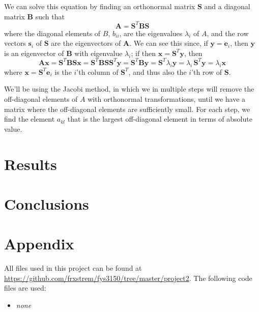 \documentclass[11pt,a4paper]{article}
\newcommand\V[1]{\mathbf{#1}}                  %
\begin{document}
We can solve this equation by finding an orthonormal matrix $\V{S}$ and a diagonal matrix $\V{B}$
such that
\begin{equation}
  \V{A} = \V{S}^T \V{B} \V{S}
\end{equation}
where the diagonal elements of $B$, $b_{ii}$, are the eigenvalues $\lambda_i$ of $A$, and the row
vectors $\V{s}_i$ of $\V{S}$ are the eigenvectors of $\V{A}$. We can see this since, if $\V{y} = \V{e}_i$, then $\V{y}$ is an eigenvector of $\V{B}$ with eigenvalue $\lambda_i$; if then $\V{x} = \V{S}^T \V{y}$, then
\begin{equation}
  \V{A} \V{x}
    = \V{S}^T \V{B} \V{S} \V{x}
    = \V{S}^T \V{B} \V{S} \V{S}^T \V{y}
    = \V{S}^T \V{B} \V{y}
    = \V{S}^T \lambda_i \V{y}
    = \lambda_i \, \V{S}^T \V{y}
    = \lambda_i \V{x}
\end{equation}
where $\V{x} = \V{S}^T \V{e}_i$ is the $i$'th column of $\V{S}^T$, and thus also the $i$'th row of $\V{S}$.

We'll be using the Jacobi method, in which we in multiple steps will remove the off-diagonal elements
of $A$ with orthonormal transformations, until we have a matrix where the off-diagonal elements are
sufficiently small. For each step, we find the element $a_{kl}$ that is the largest off-diagonal
element in terms of absolute value.

\section{Results}

\section{Conclusions}

\clearpage
\appendix
\section{Appendix}

All files used in this project can be found at \url{https://github.com/frxstrem/fys3150/tree/master/project2}.
The following code files are used:
\begin{itemize}
  \item {\it \color{red} none}
\end{itemize}

\clearpage

\printbibliography[heading=bibnumbered,title=Bibliography]
\end{document}
